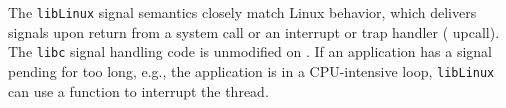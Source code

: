 
The \sysname{} {\tt libLinux} signal semantics closely match Linux behavior, which
delivers signals upon return from a system call or an interrupt or trap handler (\pal{} upcall).
The {\tt libc} signal handling code is unmodified on \sysname{}.
If an application has a signal pending for too long,
e.g., the application is in a CPU-intensive loop, {\tt libLinux} can use a \pal{} function to interrupt 
the thread. 

